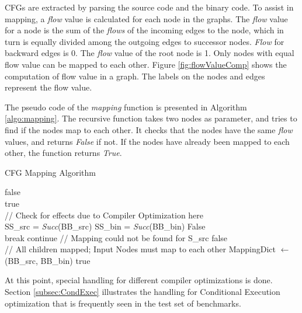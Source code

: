 CFGs are extracted by parsing the source code and the binary code. To assist in mapping, a \textit{flow} value is calculated for each node in the graphs. The \textit{flow} value for a node is the sum of the \textit{flows} of the incoming edges to the node, which in turn is equally divided among the outgoing edges to successor nodes. \textit{Flow} for backward edges is 0. The \textit{flow} value of the root node is 1. Only nodes with equal flow value can be mapped to each other. Figure \ref{fig:flowValueComp} shows the computation of flow value in a graph. The labels on the nodes and edges represent the flow value.

The pseudo code of the \emph{mapping} function is presented in Algorithm \ref{algo:mapping}. The recursive function takes two nodes as parameter, and tries to find if the nodes map to each other. It checks that the nodes have the same \textit{flow} values, and returns \textit{False} if not. If the nodes have already been mapped to each other, the function returns \textit{True}. 

\begin{algorithm}[h!]
\caption{CFG Mapping Algorithm}\label{algo:mapping}
\begin{algorithmic}[1]
\State \Return false
\EndIf
\\
\State \Return true
\EndIf
\\
\State // Check for effects due to Compiler Optimization here
\\
\State SS\_src = \textit{Succ}(BB\_src)
\State SS\_bin = \textit{Succ}(BB\_bin)
\State \Return False
\EndIf
\\
\State break
\Else
\State continue
\EndIf
\EndFor
\State // Mapping could not be found for S\_src
\State \Return false
\EndFor
\\
\State // All children mapped; Input Nodes must map to each other
\State MappingDict $\leftarrow$ (BB\_src, BB\_bin)
\State \Return true
\\
\EndFunction
\end{algorithmic}
\end{algorithm}

At this point, special handling for different compiler optimizations is done. Section \ref{subsec:CondExec} illustrates the handling for Conditional Execution optimization that is frequently seen in the test set of benchmarks.

